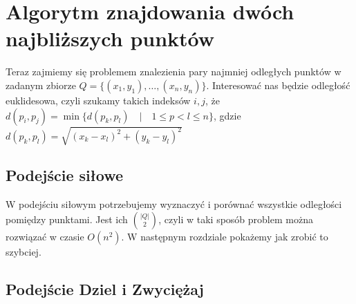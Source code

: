 \section{Algorytm znajdowania dwóch najbliższych punktów}

\label{sec:dwanajblizszepunkty}

Teraz zajmiemy się problemem znalezienia pary najmniej odległych punktów w zadanym zbiorze $Q = \{(x_1, y_1), \ldots, (x_n, y_n)\}$.
Interesować nas będzie odległość euklidesowa, czyli szukamy takich indeksów $i, j$, że $d(p_i, p_j) = \min\{d(p_k, p_l) \quad | \quad 1 \leq p < l \leq n\}$, gdzie $d(p_k, p_l) = \sqrt{(x_k - x_l)^2 + (y_k - y_l)^2}$

\subsection{Podejście siłowe}

W podejściu siłowym potrzebujemy wyznaczyć i porównać wszystkie odległości pomiędzy punktami. 
Jest ich ${|Q|}\choose{2}$, czyli w taki sposób problem można rozwiązać w czasie $O(n^2)$. 
W następnym rozdziale pokażemy jak zrobić to szybciej.

\subsection{Podejście Dziel i Zwyciężaj}

